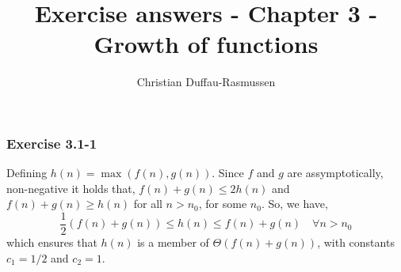 \documentclass{article}
\title{Exercise answers - Chapter 3 - Growth of functions}
\author{Christian Duffau-Rasmussen}
\begin{document}
\maketitle

\subsubsection*{Exercise 3.1-1}

Defining $h(n) = \max(f(n), g(n))$. Since $f$ and $g$ are assymptotically, non-negative it holds that, $f(n)+ g(n) \leq 2h(n)$ and $f(n) + g(n)\geq h(n)$ for all $n>n_0$, for some $n_0$. So, we have,
\[
\frac{1}{2}(f(n) + g(n)) \leq h(n) \leq f(n) + g(n)\quad\forall n>n_0
\]
which ensures that $h(n)$ is a member of $\Theta(f(n) + g(n))$, with constants $c_1=1/2$ and $c_2=1$. 
\end{document}
